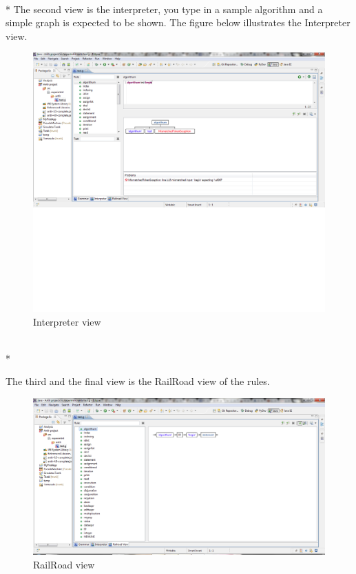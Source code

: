 \documentclass[a4paper]{article}
\begin{document}
\\*
The second view is the interpreter, you type in a sample algorithm and a simple graph is expected to be shown. The figure below illustrates the Interpreter view.

\begin{figure}[h!]
\centering
\includegraphics{report3.png}
\caption{Interpreter view}
\label{threadsVsSync}
\end{figure}

\\*

The third and the final view is the RailRoad view of the rules.

\begin{figure}[h!]
\centering
\includegraphics{report4.png}
\caption{RailRoad view}
\label{threadsVsSync}
\end{figure}
\end{document}

